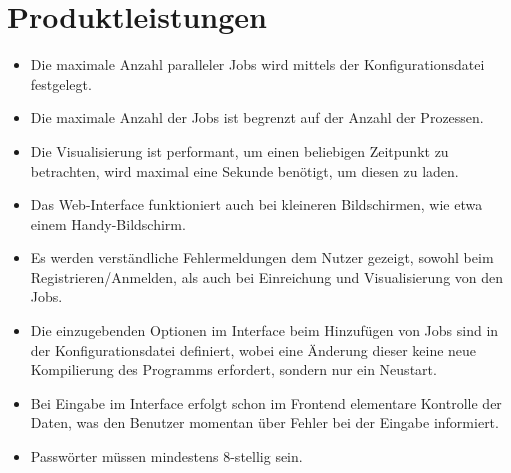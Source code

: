 \section{Produktleistungen}
\begin{itemize}
    \item Die maximale Anzahl paralleler Jobs wird mittels der Konfigurationsdatei festgelegt. 
    \item Die maximale Anzahl der Jobs ist begrenzt auf der Anzahl der Prozessen.
    \item Die Visualisierung ist performant, um einen beliebigen Zeitpunkt zu betrachten, wird maximal eine Sekunde benötigt, um diesen zu laden. 
    \item Das Web-Interface funktioniert auch bei kleineren Bildschirmen, wie etwa einem Handy-Bildschirm.
    \item Es werden verständliche Fehlermeldungen dem Nutzer gezeigt, sowohl beim Registrieren/Anmelden, als auch bei Einreichung und Visualisierung von den Jobs.
    \item Die einzugebenden Optionen im Interface beim Hinzufügen von Jobs sind in der Konfigurationsdatei definiert, wobei eine Änderung dieser keine neue Kompilierung des Programms erfordert, sondern nur ein Neustart.
    \item Bei Eingabe im Interface erfolgt schon im Frontend elementare Kontrolle der Daten, was den Benutzer momentan über Fehler bei der Eingabe informiert.
     \item Passwörter müssen mindestens 8-stellig sein.

\end{itemize}